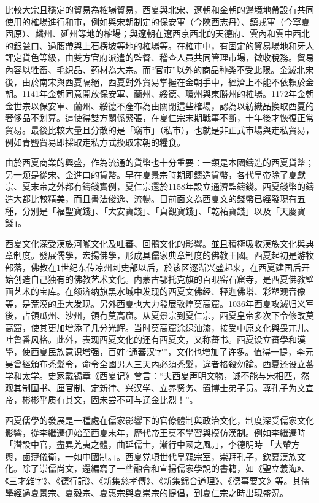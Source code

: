 比較大宗且穩定的貿易為榷場貿易，西夏與北宋、遼朝和金朝的邊境地帶設有共同使用的榷場進行和市，例如與宋朝制定的保安軍（今陝西志丹）、鎮戎軍（今寧夏固原）、麟州、延州等地的榷場；與遼朝在遼西京西北的天德府、雲內和雲中西北的銀瓮口、過腰帶與上石楞坡等地的榷場等。在榷市中，有固定的貿易場地和牙人評定貨色等級，由雙方官府派遣的監督、稽查人員共同管理市場，徵收稅務。貿易內容以牲畜、毛织品、药材為大宗。而“官市”以外的商品种类不受此限。金滅北宋後，由於南宋與西夏隔絕，西夏對外貿易掌握在金朝手中，經濟上不能不依賴於金朝。1141年金朝同意開放保安軍、蘭州、綏德、環州與東勝州的榷場。1172年金朝金世宗以保安軍、蘭州、綏德不產布為由關閉這些榷場，認為以紡織品換取西夏的奢侈品不划算。這使得雙方關係緊張，在夏仁宗末期戰事不斷，十年後才恢復正常貿易。最後比較大量且分散的是「竊市」（私市），也就是非正式市場與走私貿易，例如青鹽貿易即採取走私方式換取宋朝的糧食。

由於西夏商業的興盛，作為流通的貨幣也十分重要：一類是本國鑄造的西夏貨幣；另一類是從宋、金進口的貨幣。早在夏景宗時期即鑄造貨幣，各代皇帝除了夏獻宗、夏末帝之外都有鑄錢實例，夏仁宗還於1158年設立通濟監鑄錢。西夏錢幣的鑄造大都比較精美，而且書法俊逸、流暢。目前面文為西夏文的錢幣已經發現有五種，分別是「福聖寶錢」、「大安寶錢」、「貞觀寶錢」、「乾祐寶錢」以及「天慶寶錢」。

西夏文化深受漢族河隴文化及吐蕃、回鶻文化的影響。並且積極吸收漢族文化與典章制度。發展儒學，宏揚佛學，形成具儒家典章制度的佛教王國。西夏起初是游牧部落，佛教在1世纪东传凉州刺史部以后，於该区逐渐兴盛起来，在西夏建国后开始创造自己独有的佛教艺术文化。内蒙古鄂托克旗的百眼窑石窟寺，是西夏佛教壁画艺术的宝库。在额济纳旗黑水城中发现的西夏文佛经、释迦佛塔、彩塑观音像等，是荒漠的重大发现。另外西夏也大力發展敦煌莫高窟。1036年西夏攻滅归义军後，占領瓜州、沙州，領有莫高窟。从夏景宗到夏仁宗，西夏皇帝多次下令修改莫高窟，使其更加增添了几分光辉。当时莫高窟涂绿油漆，接受中原文化與畏兀儿、吐鲁番风格。此外，表现西夏文化的还有西夏文，又称蕃书。西夏设立蕃學和漢學，使西夏民族意识增强，百姓“通蕃汉字”，文化也增加了许多。值得一提，李元昊曾經頒布禿髮令，命令全國男人三天內必須禿髮，違者格殺勿論。西夏还设立蕃学和太学。史家戴锡章《西夏记》曾言：“夫西夏声明文物，诚不能与宋相匹，然观其制国书、厘官制、定新律、兴汉学、立养贤务、置博士弟子员。尊孔子为文宣帝，彬彬乎质有其文，固未尝不可与辽金比烈！”。

西夏儒學的發展是一種處在儒家影響下的官僚體制與政治文化，制度深受儒家文化影響，從李繼遷伊始至西夏末年，歷代帝王莫不學習與模仿漢制。例如李繼遷時「潛設中官，盡異羌夷之體，曲延儒士，漸行中國之風。」，李德明時 「大輦方輿，鹵薄儀衛，一如中國制。」。西夏党項世代皇親宗室，崇拜孔子，欽慕漢族文化。除了崇儒尚文，還編寫了一些融合和宣揚儒家學說的書籍，如《聖立義海》、《三才雜字》、《德行記》、《新集慈孝傳》、《新集錦合道理》、《德事要文》等。其儒學經過夏景宗、夏毅宗、夏惠宗與夏崇宗的提倡，到夏仁宗之時出現盛況。


